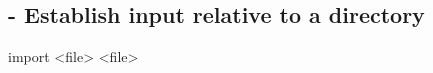 
\subsection{ - Establish input relative to a directory}

\begin{demo}{}{import}
  {<file>}
  {<file>}
\end{demo}
